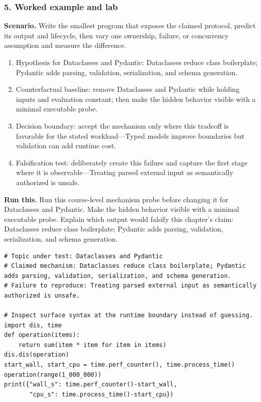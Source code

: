 \subsubsection*{5. Worked example and lab}
\textbf{Scenario.} Write the smallest program that exposes the claimed protocol, predict its output and lifecycle, then vary one ownership, failure, or concurrency assumption and measure the difference.
\begin{enumerate}
\item Hypothesis for Dataclasses and Pydantic: Dataclasses reduce class boilerplate; Pydantic adds parsing, validation, serialization, and schema generation.
\item Counterfactual baseline: remove Dataclasses and Pydantic while holding inputs and evaluation constant; then make the hidden behavior visible with a minimal executable probe.
\item Decision boundary: accept the mechanism only where this tradeoff is favorable for the stated workload—Typed models improve boundaries but validation can add runtime cost.
\item Falsification test: deliberately create this failure and capture the first stage where it is observable—Treating parsed external input as semantically authorized is unsafe.
\end{enumerate}
\textbf{Run this.} Run this course-level mechanism probe before changing it for Dataclasses and Pydantic. Make the hidden behavior visible with a minimal executable probe. Explain which output would falsify this chapter's claim: Dataclasses reduce class boilerplate; Pydantic adds parsing, validation, serialization, and schema generation.
\begin{Verbatim}[fontsize=\scriptsize]
# Topic under test: Dataclasses and Pydantic
# Claimed mechanism: Dataclasses reduce class boilerplate; Pydantic adds parsing, validation, serialization, and schema generation.
# Failure to reproduce: Treating parsed external input as semantically authorized is unsafe.

# Inspect surface syntax at the runtime boundary instead of guessing.
import dis, time
def operation(items):
    return sum(item * item for item in items)
dis.dis(operation)
start_wall, start_cpu = time.perf_counter(), time.process_time()
operation(range(1_000_000))
print({"wall_s": time.perf_counter()-start_wall,
       "cpu_s": time.process_time()-start_cpu})
\end{Verbatim}
